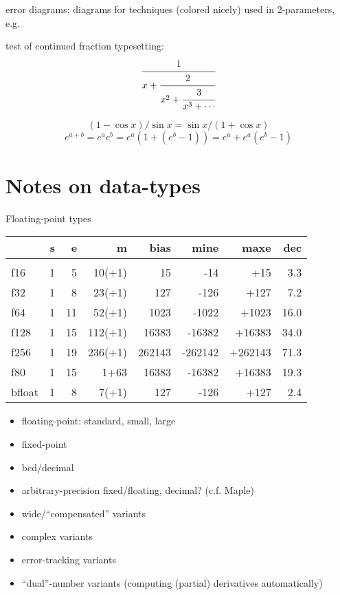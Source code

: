 \documentclass[10pt,dvipdfmx,letterpaper,twoside]{article}
\begin{document}
error diagrams; diagrams for techniques (colored nicely) used in 2-parameters, e.g.

test of continued fraction typesetting:
\[ \cfrac{1}{x + \cfrac{2}{x^2 + \cfrac{3}{x^3 + \cdots }}} \]

\[(1-\cos x)/\sin x = \sin x / (1+\cos x) \]
\[ e^{a+b} = e^{a}e^{b} = e^{a}(1+(e^{b}-1)) = e^{a} + e^{a}(e^{b}-1) \]

\section{Notes on data-types}
Floating-point types
\begin{tabular}{lrrr|r|rr|r}
         & s &  e &       m &   bias &    mine &    maxe &  dec \\
  \hline\\
  f16    & 1 &  5 &  10(+1) &     15 &     -14 &     +15 &  3.3 \\
  f32    & 1 &  8 &  23(+1) &    127 &    -126 &    +127 &  7.2 \\
  f64    & 1 & 11 &  52(+1) &   1023 &   -1022 &   +1023 & 16.0 \\
  f128   & 1 & 15 & 112(+1) &  16383 &  -16382 &  +16383 & 34.0 \\
  f256   & 1 & 19 & 236(+1) & 262143 & -262142 & +262143 & 71.3 \\
  f80    & 1 & 15 &    1+63 &  16383 &  -16382 &  +16383 & 19.3 \\
  bfloat & 1 &  8 &   7(+1) &    127 &    -126 &    +127 &  2.4 \\
\end{tabular}
\begin{itemize}
  \item floating-point: standard, small, large
  \item fixed-point
  \item bcd/decimal
  \item arbitrary-precision fixed/floating, decimal? (c.f. Maple)
  \item wide/``compensated'' variants
  \item complex variants
  \item error-tracking variants
  \item ``dual''-number variants (computing (partial) derivatives automatically)
\end{itemize}

\end{document}
